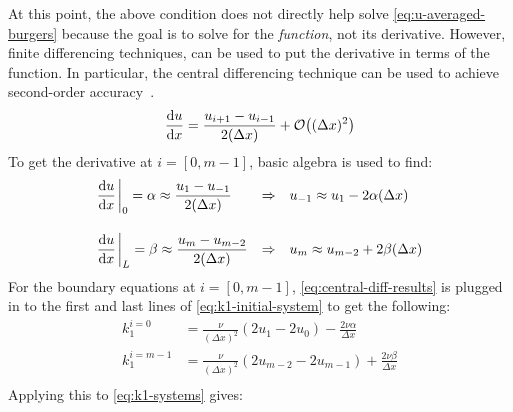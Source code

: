 At this point, the above condition does not directly help solve \cref{eq:u-averaged-burgers} because the goal is to solve for the \textit{function}, not its derivative.
However, finite differencing techniques, can be used to put the derivative in terms of the function.
In particular, the central differencing technique can be used to achieve second-order accuracy~\autocite{yewNumericalDifferentiationFinite2011a}.
\begin{equation}
    \label{eq:central-differencing}
    \dv{u}{x}= \frac{u_{i+1}-u_{i-1}}{2(\Delta x)}+\order{(\Delta x)^2}
\end{equation}
To get the derivative at $i=[0,m-1]$, basic algebra is used to find:
\begin{equation}
    \label{eq:central-diff-results}
    \begin{alignedat}{4}
        &\dv{u}{x}\eval_0=\alpha\approx \frac{u_1-u_{-1}}{2(\Delta x)}\quad&\Rightarrow \quad &u_{-1}\approx u_1-2\alpha(\Delta x)\\[10pt]
        &\dv{u}{x}\eval_L=\beta\approx \frac{u_m-u_{m-2}}{2(\Delta x)}\quad&\Rightarrow \quad &u_m\approx u_{m-2}+2\beta (\Delta x)
    \end{alignedat}
\end{equation}
For the boundary equations at $i=[0,m-1]$, \cref{eq:central-diff-results} is plugged in to the first and last lines of \cref{eq:k1-initial-system} to get the following:
\begin{equation}
    \label{eq:neumann-boundary-equations}
    \begin{split}
        k_1^{i=0} &= \frac{\nu }{(\Delta x)^2}\left( 2u_1-2u_0 \right)-\frac{2\nu \alpha }{\Delta x}\\[10pt]
        k_1^{i=m-1} &= \frac{\nu }{(\Delta x)^2}\left( 2u_{m-2}-2u_{m-1} \right)+\frac{2\nu \beta }{\Delta x}\\
    \end{split}
\end{equation}
Applying this to \cref{eq:k1-systems} gives:
